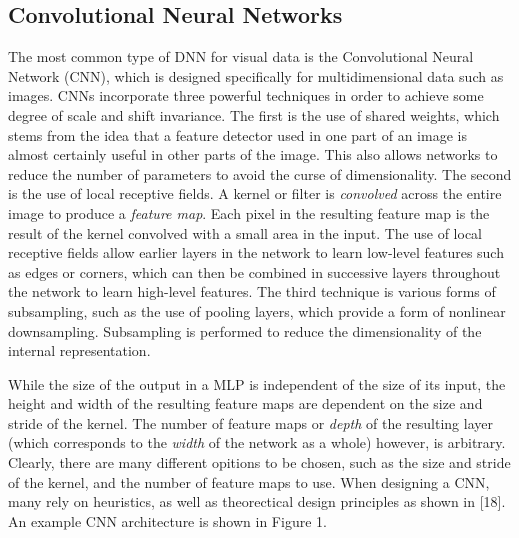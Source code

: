 \documentclass[9pt]{article}
\begin{document}
\subsection{Convolutional Neural Networks}
\noindent The most common type of DNN for visual data is the Convolutional Neural Network (CNN), which is designed specifically for
multidimensional data such as images. CNNs incorporate three powerful techniques in order to achieve some degree of scale and shift invariance.
The first is the use of shared weights, which stems from the idea that a feature detector used in one part of an image is almost certainly useful in
other parts of the image. This also allows networks to reduce the number of parameters to avoid the curse of dimensionality. The second is the use of
local receptive fields. A kernel or filter is \textit{convolved} across the entire
image to produce a \textit{feature map}. Each pixel in the resulting feature map is the result of the kernel convolved with a small area in the input.
The use of local receptive fields allow earlier layers in the network to learn low-level features such as edges or corners, which can then be combined
in successive layers throughout the network to learn high-level features. The third technique is various forms of subsampling, such as the use of pooling
layers, which provide a form of nonlinear downsampling. Subsampling is performed to reduce the dimensionality of the internal representation. \newline

\noindent While the size of the output in a MLP is independent of the size of its input,
the height and width of the resulting feature maps are dependent on the size and stride of the kernel. The number of feature maps or \textit{depth} of the
resulting layer (which corresponds to the \textit{width} of the network as a whole) however, is arbitrary. Clearly, there are many different opitions to be chosen,
such as the size and stride of the kernel, and the number of feature maps to use. When designing a CNN, many rely on heuristics, as well as theorectical
design principles as shown in [18]. An example CNN architecture is shown in Figure 1. \newline

\end{document}
